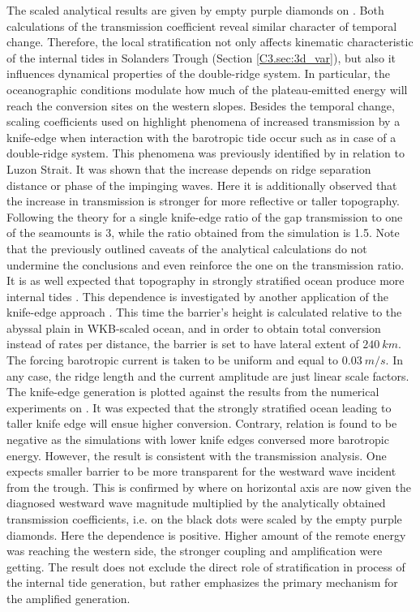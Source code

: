 \documentclass[12pt]{article}
\begin{document}
The scaled analytical results are given by empty purple diamonds on . 
Both calculations of the transmission coefficient reveal similar character of temporal change. 
Therefore, the local stratification not only affects kinematic characteristic of the internal 
tides 
in 
Solanders Trough (Section \ref{C3.sec:3d_var}), but also it influences dynamical properties of the 
double-ridge system. In particular, the oceanographic conditions modulate how much of the 
plateau-emitted energy will reach the conversion sites on the western slopes. Besides the temporal 
change, scaling coefficients used on  highlight phenomena of 
increased transmission by a knife-edge when interaction with the barotropic tide occur such as in 
case of a double-ridge system. This 
phenomena was previously identified by \cite{klymak2013parameterizing} in relation to 
Luzon Strait. It was shown that the increase depends on ridge separation distance or phase of the 
impinging waves. Here it is additionally observed that the increase in transmission is stronger for 
more reflective or taller topography. Following the theory for a single knife-edge ratio of the gap 
transmission to one of the seamounts is 3, while the ratio obtained from the simulation is 1.5. 
Note 
that the previously outlined caveats of the analytical calculations do not undermine the 
conclusions and even reinforce the one on the transmission ratio.\\

It is as well expected that topography in strongly stratified ocean produce more internal tides 
\citep{holloway1999internal}. This dependence is investigated by another application of the 
knife-edge approach \citep{st2003generation}. This time the barrier's height is calculated 
relative to the abyssal plain in WKB-scaled ocean, and in order to obtain total conversion 
instead 
of rates per 
distance, the barrier is set to have  
lateral extent of $240~km$. The forcing barotropic current is taken to be uniform and equal to 
$0.03~m/s$. In any case, the ridge length and the current amplitude are just linear scale factors. 
The knife-edge generation is plotted against the results from the numerical experiments on 
. It was expected that the strongly stratified ocean leading to taller 
knife edge will ensue higher conversion. Contrary, relation is found to be negative as the 
simulations with lower knife edges conversed more barotropic energy. However, the result is 
consistent with the transmission analysis. One expects smaller barrier to be more transparent for 
the westward wave incident from the trough. This is confirmed by  where on 
horizontal axis are now given the diagnosed westward wave magnitude multiplied by the analytically 
obtained transmission coefficients, i.e. on  the black dots were scaled 
by the 
empty 
purple diamonds. Here the dependence is positive. Higher amount of the remote energy was reaching 
the western side, the stronger coupling and amplification were getting. The result does not exclude 
the direct role of stratification in process of the internal tide generation, but rather emphasizes 
the primary 
mechanism 
for the amplified generation.\\
\end{document}
